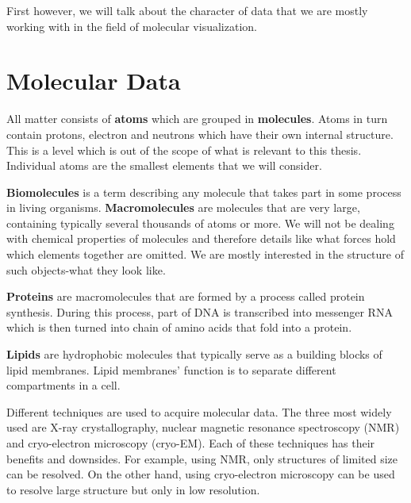 \documentclass[
  digital, %
  table,   %
  nolof,     %
  nolot,     %
]{fithesis3}
\begin{document}
First however, we will talk about the character of data that we are mostly working with in the field of molecular visualization.


\section{Molecular Data}
All matter consists of \textbf{atoms} which are grouped in \textbf{molecules}. Atoms in turn contain protons, electron and neutrons which have their own internal structure. This is a level which is out of the scope of what is relevant to this thesis. Individual atoms are the smallest elements that we will consider.

\textbf{Biomolecules} is a term describing any molecule that takes part in some process in living organisms. \textbf{Macromolecules} are molecules that are very large, containing typically several thousands of atoms or more. We will not be dealing with chemical properties of molecules and therefore details like what forces hold which elements together are omitted. We are mostly interested in the structure of such objects-what they look like.

\textbf{Proteins} are macromolecules that are formed by a process called protein synthesis. During this process, part of DNA is transcribed into messenger RNA which is then turned into chain of amino acids that fold into a protein.

\textbf{Lipids} are hydrophobic molecules that typically serve as a building blocks of lipid membranes. Lipid membranes' function is to separate different compartments in a cell.

Different techniques are used to acquire molecular data. The three most widely used are X-ray crystallography, nuclear magnetic resonance spectroscopy (NMR) and cryo-electron microscopy (cryo-EM). Each of these techniques has their benefits and downsides. For example, using NMR, only structures of limited size can be resolved. On the other hand, using cryo-electron microscopy can be used to resolve large structure but only in low resolution.
\end{document}

